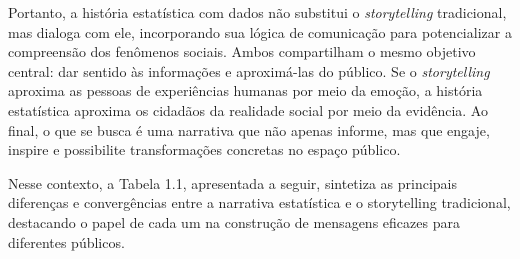 Portanto, a história estatística com dados não substitui o \textit{storytelling} tradicional, mas dialoga com ele, incorporando sua lógica de comunicação para potencializar a compreensão dos fenômenos sociais. Ambos compartilham o mesmo objetivo central: dar sentido às informações e aproximá-las do público. Se o \textit{storytelling} aproxima as pessoas de experiências humanas por meio da emoção, a história estatística aproxima os cidadãos da realidade social por meio da evidência. Ao final, o que se busca é uma narrativa que não apenas informe, mas que engaje, inspire e possibilite transformações concretas no espaço público.



\newpage
Nesse contexto, a Tabela 1.1, apresentada a seguir, sintetiza as principais diferenças e convergências entre a narrativa estatística e o storytelling tradicional, destacando o papel de cada um na construção de mensagens eficazes para diferentes públicos.


